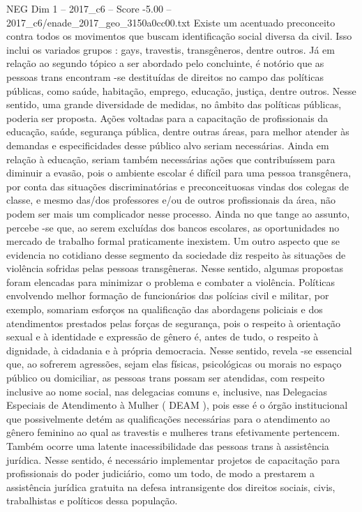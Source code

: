 \begin{textsample}{NEG Dim 1 – 2017\_c6 – Score -5.00 – 2017\_c6/enade\_2017\_geo\_3150a0cc00.txt}
Existe um acentuado preconceito contra todos os movimentos que buscam identificação social diversa da civil.
Isso inclui os variados grupos : gays, travestis, transgêneros, dentre outros.
Já em relação ao segundo tópico a ser abordado pelo concluinte, é notório que as pessoas trans encontram -se destituídas de direitos no campo das políticas públicas, como saúde, habitação, emprego, educação, justiça, dentre outros.
Nesse sentido, uma grande diversidade de medidas, no âmbito das políticas públicas, poderia ser proposta.
Ações voltadas para a capacitação de profissionais da educação, saúde, segurança pública, dentre outras áreas, para melhor atender às demandas e especificidades desse público alvo seriam necessárias.
Ainda em relação à educação, seriam também necessárias ações que contribuíssem para diminuir a evasão, pois o ambiente escolar é difícil para uma pessoa transgênera, por conta das situações discriminatórias e preconceituosas vindas dos colegas de classe, e mesmo das/dos professores e/ou de outros profissionais da área, não podem ser mais um complicador nesse processo.
Ainda no que tange ao assunto, percebe -se que, ao serem excluídas dos bancos escolares, as oportunidades no mercado de trabalho formal praticamente inexistem.
Um outro aspecto que se evidencia no cotidiano desse segmento da sociedade diz respeito às situações de violência sofridas pelas pessoas transgêneras.
Nesse sentido, algumas propostas foram elencadas para minimizar o problema e combater a violência.
Políticas envolvendo melhor formação de funcionários das polícias civil e militar, por exemplo, somariam esforços na qualificação das abordagens policiais e dos atendimentos prestados pelas forças de segurança, pois o respeito à orientação sexual e à identidade e expressão de gênero é, antes de tudo, o respeito à dignidade, à cidadania e à própria democracia.
Nesse sentido, revela -se essencial que, ao sofrerem agressões, sejam elas físicas, psicológicas ou morais no espaço público ou domiciliar, as pessoas trans possam ser atendidas, com respeito inclusive ao nome social, nas delegacias comuns e, inclusive, nas Delegacias Especiais de Atendimento à Mulher ( DEAM ), pois esse é o órgão institucional que possivelmente detém as qualificações necessárias para o atendimento ao gênero feminino ao qual as travestis e mulheres trans efetivamente pertencem.
Também ocorre uma latente inacessibilidade das pessoas trans à assistência jurídica.
Nesse sentido, é necessário implementar projetos de capacitação para profissionais do poder judiciário, como um todo, de modo a prestarem a assistência jurídica gratuita na defesa intransigente dos direitos sociais, civis, trabalhistas e políticos dessa população.

\end{textsample}
